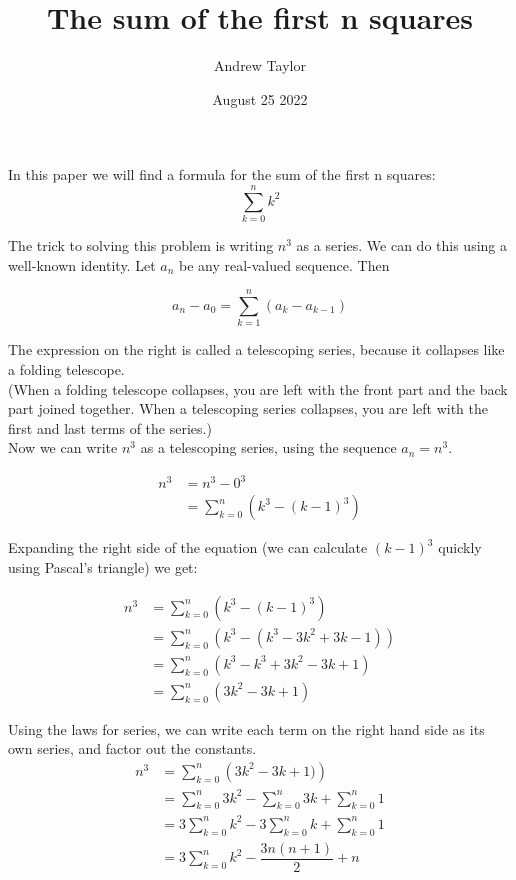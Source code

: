 \documentclass{article}
\title{The sum of the first n squares}
\author{Andrew Taylor}
\date{August 25 2022}
\begin{document}
\maketitle

In this paper we will find a formula for the sum of the first n squares: $$ \sum_{k=0}^{n} k^{2} $$

The trick to solving this problem is writing $n^3$ as a series. We can do this using a well-known identity. Let $a_n$ be any real-valued sequence. Then

\begin{equation*}
a_{n} - a_{0} = \sum_{k=1}^{n} \left( a_{k} - a_{k-1} \right)
\end{equation*}

The expression on the right is called a telescoping series, because it collapses like a folding telescope. \\

(When a folding telescope collapses, you are left with the front part and the back part joined together. When a telescoping series collapses, you are left with the first and last terms of the series.) \\

Now we can write $n^3$ as a telescoping series, using the sequence $a_{n} = n^{3}$.

\begin{align*}
n^3 &= n^3 - 0^3 \\
&= \sum_{k=0}^{n} \left( k^3 - (k-1)^3 \right)
\end{align*}

Expanding the right side of the equation (we can calculate $(k-1)^3$ quickly using Pascal's triangle) we get:

\begin{align*}
n^3 &= \sum_{k=0}^{n} \left( k^3 - (k-1)^3 \right) \\
&= \sum_{k=0}^{n} \left( k^3 - (k^3 - 3k^2 + 3k - 1) \right) \\
&= \sum_{k=0}^{n} \left( k^3 - k^3 + 3k^2 - 3k + 1 \right) \\
&= \sum_{k=0}^{n} \left( 3k^2 - 3k + 1 \right) 
\end{align*}

Using the laws for series, we can write each term on the right hand side as its own series, and factor out the constants. \\

\begin{align*}
n^3 &= \sum_{k=0}^{n} \left( 3k^2 - 3k + 1) \right) \\
&= \sum_{k=0}^{n} 3k^2 - \sum_{k=0}^{n} 3k + \sum_{k=0}^{n} 1 \\
&= 3 \sum_{k=0}^{n} k^2 - 3 \sum_{k=0}^{n} k + \sum_{k=0}^{n} 1 \\
&= 3 \sum_{k=0}^{n} k^2 - \dfrac{3n(n+1)}{2} + n \\
\end{align*}
\end{document}
